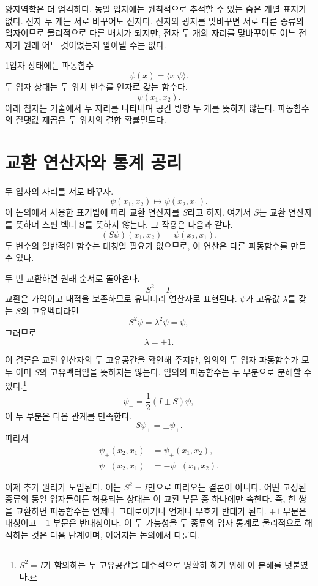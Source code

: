 양자역학은 더 엄격하다. 동일 입자에는 원칙적으로 추적할 수 있는 숨은 개별 표지가 없다. 전자 두 개는 서로 바꾸어도 전자다. 전자와 광자를 맞바꾸면 서로 다른 종류의 입자이므로 물리적으로 다른 배치가 되지만, 전자 두 개의 자리를 맞바꾸어도 어느 전자가 원래 어느 것이었는지 알아낼 수는 없다.

1입자 상태에는 파동함수
\[
\psi(x)=\langle x\vert\psi\rangle.
\]
두 입자 상태는 두 위치 변수를 인자로 갖는 함수다.
\begin{equation}
\psi(x_{1},x_{2}).
\end{equation}
아래 첨자는 기술에서 두 자리를 나타내며 공간 방향 두 개를 뜻하지 않는다. 파동함수의 절댓값 제곱은 두 위치의 결합 확률밀도다.

\section{교환 연산자와 통계 공리}

두 입자의 자리를 서로 바꾸자.
\begin{equation}
\psi(x_{1},x_{2})\longmapsto\psi(x_{2},x_{1}).
\end{equation}
이 논의에서 사용한 표기법에 따라 교환 연산자를 \(S\)라고 하자. 여기서 \(S\)는 교환 연산자를 뜻하며 스핀 벡터 \(\mathbf S\)를 뜻하지 않는다. 그 작용은 다음과 같다.
\begin{equation}
(S\psi)(x_{1},x_{2})=\psi(x_{2},x_{1}).
\end{equation}
두 변수의 일반적인 함수는 대칭일 필요가 없으므로, 이 연산은 다른 파동함수를 만들 수 있다.

두 번 교환하면 원래 순서로 돌아온다.
\begin{equation}
S^{2}=I.
\end{equation}
교환은 가역이고 내적을 보존하므로 유니터리 연산자로 표현된다. \(\psi\)가 고유값 \(\lambda\)를 갖는 \(S\)의 고유벡터라면
\[
S^{2}\psi=\lambda^{2}\psi=\psi,
\]
그러므로
\begin{equation}
\lambda=\pm1.
\end{equation}

이 결론은 교환 연산자의 두 고유공간을 확인해 주지만, 임의의 두 입자 파동함수가 모두 이미 \(S\)의 고유벡터임을 뜻하지는 않는다. 임의의 파동함수는 두 부분으로 분해할 수 있다.\footnote{\(S^{2}=I\)가 함의하는 두 고유공간을 대수적으로 명확히 하기 위해 이 분해를 덧붙였다.}\begin{equation}
\psi_{\pm}=\frac12(I\pm S)\psi,
\end{equation}이 두 부분은 다음 관계를 만족한다.
\begin{equation}
S\psi_{\pm}=\pm\psi_{\pm}.
\end{equation}
따라서
\begin{align}
\psi_{+}(x_{2},x_{1})&=\psi_{+}(x_{1},x_{2}),\\
\psi_{-}(x_{2},x_{1})&=-\psi_{-}(x_{1},x_{2}).
\end{align}

이제 추가 원리가 도입된다. 이는 \(S^{2}=I\)만으로 따라오는 결론이 아니다. 어떤 고정된 종류의 동일 입자들이든 허용되는 상태는 이 교환 부문 중 하나에만 속한다. 즉, 한 쌍을 교환하면 파동함수는 언제나 그대로이거나 언제나 부호가 반대가 된다. \(+1\) 부문은 대칭이고 \(-1\) 부문은 반대칭이다. 이 두 가능성을 두 종류의 입자 통계로 물리적으로 해석하는 것은 다음 단계이며, 이어지는 논의에서 다룬다.
